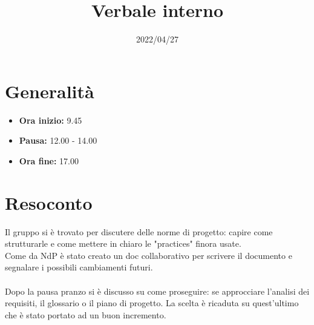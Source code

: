 \documentclass{classes/base}
\title{Verbale interno}
\date{2022/04/27}
\author{\marcob}
\renewcommand{\maketitle}{
    
}
\begin{document}
    \maketitle

    \section*{Generalità}
    \begin{itemize}
        \item \textbf{Ora inizio:} 9.45
        \item  \textbf{Pausa: } 12.00 - 14.00
        \item \textbf{Ora fine:} 17.00
    \end{itemize}

    \section*{Resoconto}
    Il gruppo si è trovato per discutere delle norme di progetto: capire come strutturarle e come mettere in chiaro le "practices" finora usate.\\
    Come da NdP è stato creato un doc collaborativo per scrivere il documento e segnalare i possibili cambiamenti futuri.\\\\
    Dopo la pausa pranzo si è discusso su come proseguire: se approcciare l'analisi dei requisiti, il glossario o il piano di progetto. La scelta è ricaduta su quest'ultimo che è stato portato ad un buon incremento. 
\end{document}
